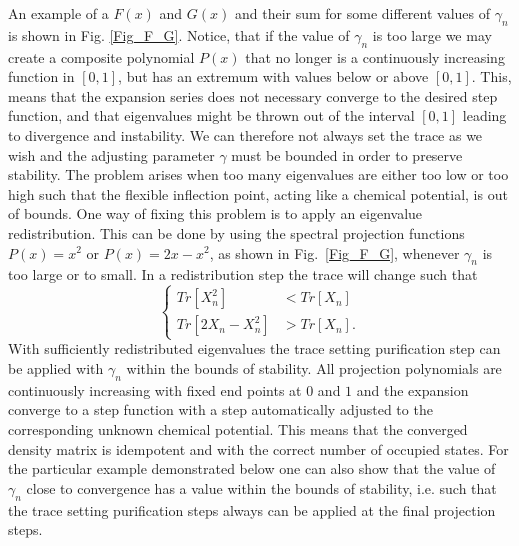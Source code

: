 \commentoutA{\documentclass[prb,aps,twocolumn,twocolumngrid,secnumarabic,superbib,hyperref]{revtex4}}
\begin{document}
An example of a $F(x)$ and $G(x)$ and their sum for some
different values of $\gamma_n$ is shown in Fig. \ref{Fig_F_G}.
Notice, that if the value of $\gamma_n$ is too large we may create
a composite polynomial $P(x)$ that no longer is a continuously  increasing
function in $[0,1]$, but has an extremum with values below or above $[0,1]$.
This, means that the expansion series does not necessary converge
to the desired step function, and that eigenvalues might be thrown out
of the interval $[0,1]$ leading to divergence and instability.
We can therefore not always set the trace as we wish and
the adjusting parameter $\gamma$ must be bounded in order to preserve
stability. The problem arises when too many eigenvalues are
either too low or too high such that the flexible inflection
point, acting like a chemical potential, is out of bounds.
One way of fixing this problem is to apply an eigenvalue
redistribution. This can be done by using the spectral
projection functions  $P(x) = x^2$
or $P(x) = 2x-x^2$, as shown in Fig.\ \ref{Fig_F_G}, whenever $\gamma_n$ is 
too large or to small. In a redistribution step the trace will change 
such that
\begin{equation}
\left \{ \begin{array}{ll}
Tr[X_n^2] & < Tr[X_n]\\
Tr[2X_n-X_n^2] & > Tr[X_n].
\end{array} \right.
\end{equation}
With sufficiently
redistributed eigenvalues the trace setting purification
step can be applied with $\gamma_n$ within
the bounds of stability. All projection
polynomials are continuously increasing with fixed end
points at $0$ and $1$ and the expansion converge
to a step function with a step automatically adjusted to
the corresponding unknown chemical potential. This means
that the converged density matrix is idempotent and with
the correct number of occupied states. For the particular
example demonstrated below one can also show that the
value of $\gamma_n$ close to convergence has a value within
the bounds of stability, i.e. such that the trace setting
purification steps always can be applied at the final projection steps.

%
\end{document}
